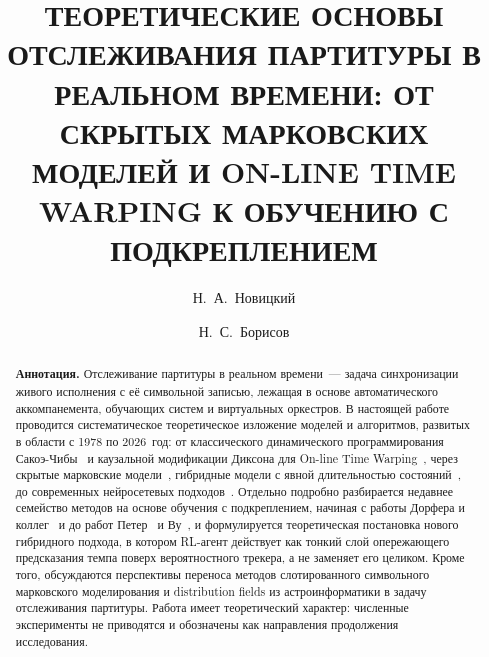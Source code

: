 \documentclass[%
  aps,
  pre,
  twocolumn,
  superscriptaddress,
  longbibliography,
  nofootinbib,
  showkeys,             %
  amsmath,amssymb,
  floatfix
]{revtex4-2}
\providecommand{\firstname}[1]{#1}
\providecommand{\surname}[1]{#1}
\begin{document}


\title{\MakeUppercase{Теоретические основы отслеживания партитуры в
       реальном времени: от скрытых марковских моделей и on-line
       time warping к обучению с подкреплением}}

\author{\firstname{Н.~А.}~\surname{Новицкий}}

\author{\firstname{Н.~С.}~\surname{Борисов}}

\begin{abstract}
\textbf{Аннотация.}\space
Отслеживание партитуры в реальном времени~--- задача синхронизации
живого исполнения с её символьной записью, лежащая в основе
автоматического аккомпанемента, обучающих систем и виртуальных
оркестров. В настоящей работе проводится систематическое
теоретическое изложение моделей и алгоритмов, развитых в области с
1978 по 2026~год: от классического динамического программирования
Сакоэ-Чибы~\cite{SakoeChiba1978} и каузальной модификации Диксона
для On-line Time Warping~\cite{Dixon2005}, через скрытые марковские
модели~\cite{Rabiner1989,OrioDechelle2001}, гибридные модели с
явной длительностью состояний~\cite{Cont2010,Nakamura2015}, до
современных нейросетевых подходов~\cite{Hawthorne2018,Henkel2021}.
Отдельно подробно разбирается недавнее семейство методов на основе
обучения с подкреплением, начиная с работы Дорфера и
коллег~\cite{Dorfer2018RL} и до работ Петер~\cite{Peter2023} и
Ву~\cite{Wu2024ReaLchords}, и формулируется теоретическая
постановка нового гибридного подхода, в котором RL-агент действует
как тонкий слой опережающего предсказания темпа поверх
вероятностного трекера, а не заменяет его целиком. Кроме того,
обсуждаются перспективы переноса методов слотированного символьного
марковского моделирования и distribution fields из астроинформатики
в задачу отслеживания партитуры. Работа имеет теоретический
характер: численные эксперименты не приводятся и обозначены как
направления продолжения исследования.
\end{abstract}
\end{document}
